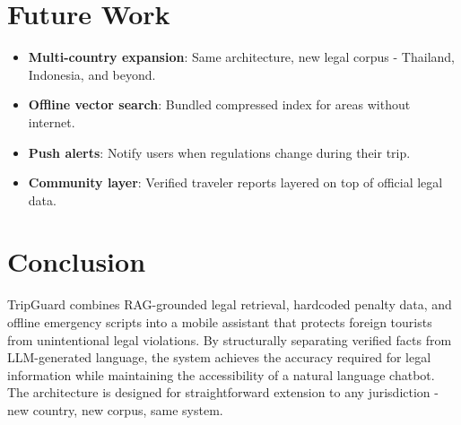 \documentclass[conference, onecolumn]{IEEEtran}
\begin{document}
\section{Future Work}

\begin{itemize}[leftmargin=*]
    \item \textbf{Multi-country expansion}: Same architecture, new legal corpus - Thailand, Indonesia, and beyond.
    \item \textbf{Offline vector search}: Bundled compressed index for areas without internet.
    \item \textbf{Push alerts}: Notify users when regulations change during their trip.
    \item \textbf{Community layer}: Verified traveler reports layered on top of official legal data.
\end{itemize}

\section{Conclusion}

TripGuard combines RAG-grounded legal retrieval, hardcoded penalty data, and offline emergency scripts into a mobile assistant that protects foreign tourists from unintentional legal violations. By structurally separating verified facts from LLM-generated language, the system achieves the accuracy required for legal information while maintaining the accessibility of a natural language chatbot. The architecture is designed for straightforward extension to any jurisdiction - new country, new corpus, same system.
\end{document}
